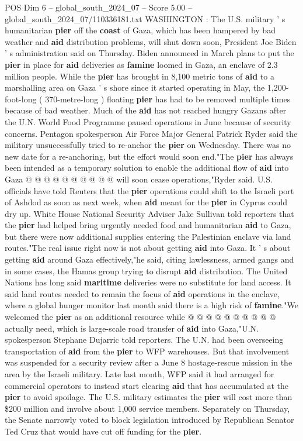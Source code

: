 \begin{textsample}{POS Dim 6 – global\_south\_2024\_07 – Score 5.00 – global\_south\_2024\_07/110336181.txt}  \label{ex:f6_pos_317}
WASHINGTON : The U.S. military ' s humanitarian \textbf{pier} off the \textbf{coast} of Gaza, which has been hampered by bad weather and \textbf{aid} distribution problems, will shut down soon, President Joe Biden ' s administration said on Thursday.
Biden announced in March plans to put the \textbf{pier} in place for \textbf{aid} deliveries as \textbf{famine} loomed in Gaza, an enclave of 2.3 million people.
While the \textbf{pier} has brought in 8,100 metric tons of \textbf{aid} to a marshalling area on Gaza ' s shore since it started operating in May, the 1,200-foot-long ( 370-metre-long ) floating \textbf{pier} has had to be removed multiple times because of bad weather.
Much of the \textbf{aid} has not reached hungry Gazans after the U.N.
World Food Programme paused operations in June because of security concerns.
Pentagon spokesperson Air Force Major General Patrick Ryder said the military unsuccessfully tried to re-anchor the \textbf{pier} on Wednesday.
There was no new date for a re-anchoring, but the effort would soon end."The \textbf{pier} has always been intended as a temporary solution to enable the additional flow of \textbf{aid} into Gaza @ @ @ @ @ @ @ @ @ @ will soon cease operations,"Ryder said.
U.S. officials have told Reuters that the \textbf{pier} operations could shift to the Israeli port of Ashdod as soon as next week, when \textbf{aid} meant for the \textbf{pier} in Cyprus could dry up.
White House National Security Adviser Jake Sullivan told reporters that the \textbf{pier} had helped bring urgently needed food and humanitarian \textbf{aid} to Gaza, but there were now additional supplies entering the Palestinian enclave via land routes."The real issue right now is not about getting \textbf{aid} into Gaza.
It ' s about getting \textbf{aid} around Gaza effectively,"he said, citing lawlessness, armed gangs and in some cases, the Hamas group trying to disrupt \textbf{aid} distribution.
The United Nations has long said \textbf{maritime} deliveries were no substitute for land access.
It said land routes needed to remain the focus of \textbf{aid} operations in the enclave, where a global hunger monitor last month said there is a high risk of \textbf{famine}."We welcomed the \textbf{pier} as an additional resource while @ @ @ @ @ @ @ @ @ @ actually need, which is large-scale road transfer of \textbf{aid} into Gaza,"U.N. spokesperson Stephane Dujarric told reporters.
The U.N. had been overseeing transportation of \textbf{aid} from the \textbf{pier} to WFP warehouses.
But that involvement was suspended for a security review after a June 8 hostage-rescue mission in the area by the Israeli military.
Late last month, WFP said it had arranged for commercial operators to instead start clearing \textbf{aid} that has accumulated at the \textbf{pier} to avoid spoilage.
The U.S. military estimates the \textbf{pier} will cost more than \$200 million and involve about 1,000 service members.
Separately on Thursday, the Senate narrowly voted to block legislation introduced by Republican Senator Ted Cruz that would have cut off funding for the \textbf{pier}.

\end{textsample}
